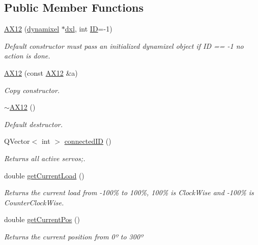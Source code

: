 \subsection*{Public Member Functions}
\begin{DoxyCompactItemize}
\item 
\hyperlink{class_a_x12_a9f8ec441088dc76084de7811844407ce}{A\+X12} (\hyperlink{classdynamixel}{dynamixel} $\ast$\hyperlink{class_a_x12_af48e370f92f69214a27618d5b69bcfe8}{dxl}, int \hyperlink{class_a_x12_a08d272b502d65464202a3aa97825aec0ab2565d5698c9d943a8bcecf02b1389ad}{I\+D}=-\/1)
\begin{DoxyCompactList}\small\item\em Default constructor must pass an initialized dynamixel object if I\+D == -\/1 no action is done. \end{DoxyCompactList}\item 
\hyperlink{class_a_x12_a37b76666533323ec317f5156dbef2a89}{A\+X12} (const \hyperlink{class_a_x12}{A\+X12} \&a)
\begin{DoxyCompactList}\small\item\em Copy constructor. \end{DoxyCompactList}\item 
\hyperlink{class_a_x12_a5e9382e65479cdcb248f5303ac4c96d9}{$\sim$\+A\+X12} ()
\begin{DoxyCompactList}\small\item\em Default destructor. \end{DoxyCompactList}\item 
Q\+Vector$<$ int $>$ \hyperlink{class_a_x12_a2fa05296aa57896a5cb0ef4ce0aa96f1}{connected\+I\+D} ()
\begin{DoxyCompactList}\small\item\em Returns all active servos;. \end{DoxyCompactList}\item 
double \hyperlink{class_a_x12_a0bd930c81b7a9c088ecab789b3a7e525}{get\+Current\+Load} ()
\begin{DoxyCompactList}\small\item\em Returns the current load from -\/100\% to 100\%, 100\% is Clock\+Wise and -\/100\% is Counter\+Clock\+Wise. \end{DoxyCompactList}\item 
double \hyperlink{class_a_x12_af9722b9c1f82fbfd97fe5e0a44369e8a}{get\+Current\+Pos} ()
\begin{DoxyCompactList}\small\item\em Returns the current position from 0º to 300º \end{DoxyCompactList}\item 

\end{DoxyCompactItemize}
